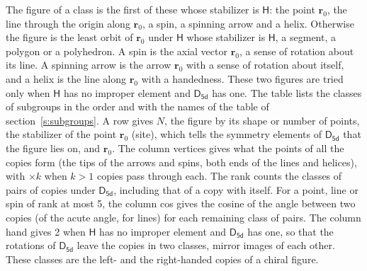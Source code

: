 \documentclass[10pt,a4paper]{article}
\numberwithin{equation}{section}
\newcommand{\grp}[1]{\mathsf{#1}}
\newcommand{\pointr}{\mathbf{r}}
\begin{document}
\leavevmode\label{n:head.figure}The figure of a class is the first of these whose stabilizer is $\grp{H}$: the point $\pointr_0$, the line through the origin along $\pointr_0$, a spin, a spinning arrow and a helix. Otherwise the figure is the least orbit of $\pointr_0$ under $\grp{H}$ whose stabilizer is $\grp{H}$, a segment, a polygon or a polyhedron. A spin is the axial vector $\pointr_0$, a sense of rotation about its line. A spinning arrow is the arrow $\pointr_0$ with a sense of rotation about itself, and a helix is the line along $\pointr_0$ with a handedness. These two figures are tried only when $\grp{H}$ has no improper element and $\grp{D_{5d}}$ has one. The table lists the classes of subgroups in the order and with the names of the table of section~\ref{s:subgroups}. \label{n:head.site}A row gives $N$, the figure by its shape or number of points, the stabilizer of the point $\pointr_0$ (site), which tells the symmetry elements of $\grp{D_{5d}}$ that the figure lies on, and $\pointr_0$. \label{n:head.vertices}The column vertices gives what the points of all the copies form (the tips of the arrows and spins, both ends of the lines and helices), with ${\times}k$ when $k > 1$ copies pass through each. \label{n:head.rank}The rank counts the classes of pairs of copies under $\grp{D_{5d}}$, including that of a copy with itself. \label{n:head.cos}For a point, line or spin of rank at most 5, the column cos gives the cosine of the angle between two copies (of the acute angle, for lines) for each remaining class of pairs. \label{n:head.hand}The column hand gives 2 when $\grp{H}$ has no improper element and $\grp{D_{5d}}$ has one, so that the rotations of $\grp{D_{5d}}$ leave the copies in two classes, mirror images of each other. These classes are the left- and the right-handed copies of a chiral figure.
\end{document}
